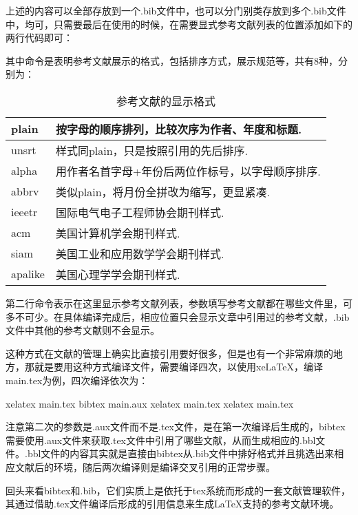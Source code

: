     上述的内容可以全部存放到一个.bib文件中，也可以分门别类存放到多个.bib文件中，均可，只需要最后在使用的时候，在需要显式参考文献列表的位置添加如下的两行代码即可：
    \begin{texcode}
        
        
    \end{texcode}
    其中命令是表明参考文献展示的格式，包括排序方式，展示规范等，共有8种，分别为：
    \begin{center}
        \setlength\tablewidth{\dimexpr (\textwidth -4\tabcolsep)}
        \begin{table}[H]
            \begin{tabular}{|p{0.3\tablewidth}<{\centering}|p{0.7\tablewidth}<{\centering}|}
                \hline
                plain&按字母的顺序排列，比较次序为作者、年度和标题.\\
                \hline
                unsrt&样式同plain，只是按照引用的先后排序.\\
                \hline
                alpha&用作者名首字母+年份后两位作标号，以字母顺序排序.\\
                \hline
                abbrv&类似plain，将月份全拼改为缩写，更显紧凑.\\
                \hline
                ieeetr&国际电气电子工程师协会期刊样式.\\
                \hline
                acm&美国计算机学会期刊样式.\\
                \hline
                siam&美国工业和应用数学学会期刊样式.\\
                \hline
                apalike&美国心理学学会期刊样式.\\
                \hline
            \end{tabular}
            \caption{参考文献的显示格式}
        \end{table}
    \end{center}

    第二行命令表示在这里显示参考文献列表，参数填写参考文献都在哪些文件里，可多不可少。在具体编译完成后，相应位置只会显示文章中引用过的参考文献，.bib文件中其他的参考文献则不会显示。

    这种方式在文献的管理上确实比直接引用要好很多，但是也有一个非常麻烦的地方，那就是要用这种方式编译文件，需要编译四次，以使用xeLaTeX，编译main.tex为例，四次编译依次为：
    \begin{languagebox}[bash]
        xelatex main.tex
        bibtex main.aux
        xelatex main.tex
        xelatex main.tex
    \end{languagebox}
    注意第二次的参数是.aux文件而不是.tex文件，是在第一次编译后生成的，bibtex需要使用.aux文件来获取.tex文件中引用了哪些文献，从而生成相应的.bbl文件。.bbl文件的内容其实就是直接由bibtex从.bib文件中排好格式并且挑选出来相应文献后的环境，随后两次编译则是编译交叉引用的正常步骤。

    回头来看bibtex和.bib，它们实质上是依托于tex系统而形成的一套文献管理软件，其通过借助.tex文件编译后形成的引用信息来生成\LaTeX{}支持的参考文献环境。

